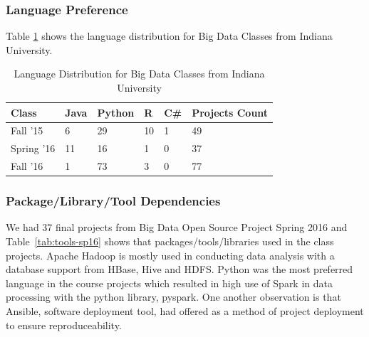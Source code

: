 \documentclass[9pt,twocolumn,twoside]{styles/osajnl}
\begin{document}
\subsubsection{Language Preference}

Table \ref{tab:lang-dist-iu} shows the language distribution for Big Data Classes from Indiana University.

\begin{table}[htb]
  \begin{center}
    \begin{small}
      \caption{Language Distribution for Big Data Classes from Indiana University}
      \label{tab:lang-dist-iu}
      \begin{threeparttable}
        \begin{tabular}{l|l|l|l|l|l}

    Class      & Java & Python & R  & C\# & Projects Count \\ \hline \hline
    Fall '15   & 6    & 29     & 10 & 1   & 49             \\ \hline
    Spring '16 & 11   & 16     & 1  & 0   & 37             \\ \hline
    Fall '16   & 1    & 73     & 3  & 0   & 77             \\ 

        \end{tabular}
      \end{threeparttable}
    \end{small}
  \end{center}
\end{table}



\subsubsection{Package/Library/Tool Dependencies}

We had 37 final projects from Big Data Open Source Project Spring 2016
and Table~\ref{tab:tools-sp16} shows that packages/tools/libraries used in the
class projects. Apache Hadoop is mostly used in conducting data analysis with a
database support from HBase, Hive and HDFS. Python was the most preferred
language in the course projects which resulted in high use of Spark in data
processing with the python library, pyspark. One another observation is that
Ansible, software deployment tool, had offered as a method of project
deployment to ensure reproduceability.
\end{document}

